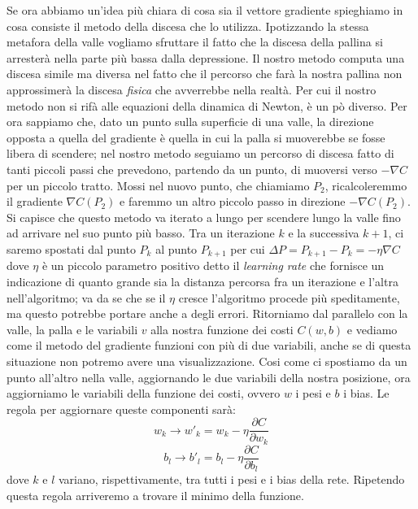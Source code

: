 Se ora abbiamo un'idea più chiara di cosa sia il vettore gradiente spieghiamo in cosa consiste il metodo della discesa che lo utilizza. Ipotizzando la stessa metafora della valle vogliamo sfruttare il fatto che la discesa della pallina si arresterà nella parte più bassa dalla depressione. Il nostro metodo computa una discesa simile ma diversa nel fatto che il percorso che farà la nostra pallina non approssimerà la discesa \textit{fisica} che avverrebbe nella realtà. Per cui il nostro metodo non si rifà alle equazioni della dinamica di Newton, è un pò diverso. Per ora sappiamo che, dato un punto sulla superficie di una valle, la direzione opposta a quella del gradiente è quella in cui la palla si muoverebbe se fosse libera di scendere; nel nostro metodo seguiamo un percorso di discesa fatto di tanti piccoli passi che prevedono, partendo da un punto, di muoversi verso $-\nabla C$ per un piccolo tratto. Mossi nel nuovo punto, che chiamiamo $P_{2}$, ricalcoleremmo il gradiente $\nabla C(P_{2})$ e faremmo un altro piccolo passo in direzione $- \nabla C(P_{2})$. Si capisce che questo metodo va iterato a lungo per scendere lungo la valle fino ad arrivare nel suo punto più basso. Tra un iterazione $k$ e la successiva $k+1$, ci saremo spostati dal punto $P_{k}$ al punto $P_{k+1}$ per cui $ \Delta P= P_{k+1}-P_{k}=-\eta \nabla C$ dove $\eta$ è un piccolo parametro positivo detto il \textit{learning rate} che fornisce un indicazione di quanto grande sia la distanza percorsa fra un iterazione e l'altra nell'algoritmo; va da se che se il $\eta$ cresce l'algoritmo procede più speditamente, ma questo potrebbe portare anche a degli errori. Ritorniamo dal parallelo con la valle, la palla e le variabili $v$ alla nostra funzione dei costi $C(w, b)$ e vediamo come il metodo del gradiente funzioni con più di due variabili, anche se di questa situazione non potremo avere una visualizzazione. Cosi come ci spostiamo da un punto all'altro nella valle, aggiornando le due variabili della nostra posizione, ora aggiorniamo le variabili della funzione dei costi, ovvero $w$ i pesi e $b$ i bias. Le regola per aggiornare queste componenti sarà:
\begin{equation}
w_{k}\rightarrow w'_{k}=w_{k}-\eta \dfrac{\partial C}{\partial w_{k}}
\end{equation}
\begin{equation}
b_{l}\rightarrow b'_{l}=b_{l}-\eta \dfrac{\partial C}{\partial b_{l}}
\end{equation}
dove $k$ e $l$ variano, rispettivamente, tra tutti i pesi e i bias della rete. Ripetendo questa regola arriveremo a trovare il minimo della funzione.
